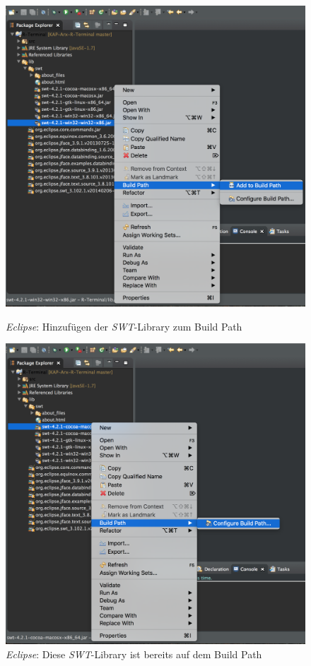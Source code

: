 \documentclass[a4paper, 12pt]{report} %
\begin{document}
\begin{enumerate}
\begin{figure}
\centering	
	\begin{minipage}{0.5\textwidth}
	\centering	
		\captionsetup{width=0.9\linewidth}
		\includegraphics[width=0.9\linewidth]{Bilder/SWT-Add-to-Build-Path}
    	\caption{\textit{Eclipse}: Hinzufügen der \textit{SWT}-Library zum Build Path}
    	\label{addToBuildPath}
	\end{minipage}%
	\begin{minipage}{0.5\textwidth}
	\centering
		\captionsetup{width=0.9\linewidth}
    	\includegraphics[width=0.9\linewidth]{Bilder/SWT-Configure-Build-Path}
    	\caption{\textit{Eclipse}: Diese \textit{SWT}-Library ist bereits auf dem Build Path}
    	\label{onBuildPath}
	\end{minipage}
\end{figure}
		

\end{enumerate}
\end{document}
